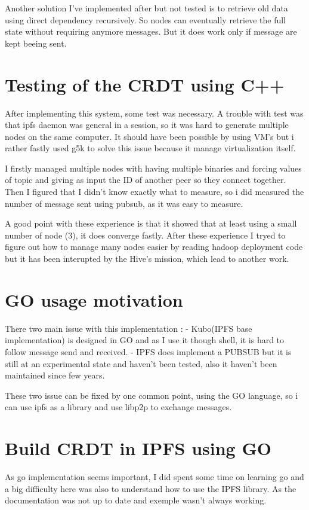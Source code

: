 \documentclass{IEEEtran}
\begin{document}
Another solution I've implemented after but not tested is to retrieve old 
data using direct dependency recursively. So nodes can eventually retrieve
the full state without requiring anymore messages. But it does work only
if message are kept beeing sent.

\section{Testing of the CRDT using C++}
After implementing this system, some test was necessary. 
A trouble with test was that ipfs daemon was general in a session,
so it was hard to generate multiple nodes on the same computer. 
It should have been possible by using VM's but i rather 
fastly used g5k to solve this issue because it manage virtualization itself.

I firstly managed multiple nodes with having multiple binaries 
and forcing values of topic and giving as input the ID of another 
peer so they connect together. 
Then I figured that I didn't know exactly what to measure, so i 
did measured the number of message sent using pubsub, as it was
 easy to measure.

A good point with these experience is that it showed that at 
least using a small number of node (3), it does converge fastly.
After these experience I tryed to figure out how to manage many 
nodes easier by reading hadoop deployment code but it has been 
interupted by the Hive's mission, which lead to another work.

\section{GO usage motivation}

There two main issue with this implementation :
- Kubo(IPFS base implementation) is designed in GO and as I use it 
though shell, it is hard to follow message send and received.
- IPFS does implement a PUBSUB but it is still at an experimental 
state and haven't been tested, also it haven't been maintained 
since few years.

These two issue can be fixed by one common point, using the GO 
language, so i can use ipfs as a library and use libp2p to 
exchange messages.

\section{Build CRDT in IPFS using GO}

As go implementation seems important, I did spent some time on 
learning go and a big difficulty here was also to understand how 
to use the IPFS library. As the documentation was not up to date 
and exemple wasn't always working.
\end{document}
